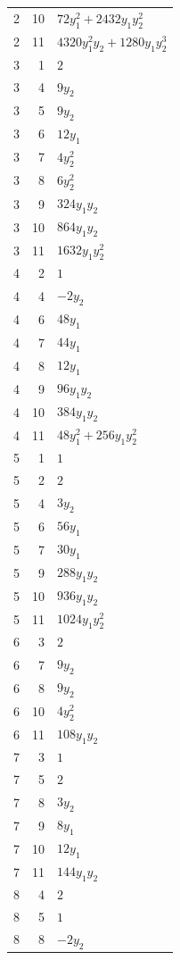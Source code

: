 \documentclass[10pt,a4paper]{article}
\begin{document}
{\begin{longtable}{rrp{125mm}}
2 & 10 & $72 y_{1}^{2} + 2432 y_{1} y_{2}^{2}$\\
2 & 11 & $4320 y_{1}^{2} y_{2} + 1280 y_{1} y_{2}^{3}$\\
3 & 1 & $2$\\
3 & 4 & $9 y_{2}$\\
3 & 5 & $9 y_{2}$\\
3 & 6 & $12 y_{1}$\\
3 & 7 & $4 y_{2}^{2}$\\
3 & 8 & $6 y_{2}^{2}$\\
3 & 9 & $324 y_{1} y_{2}$\\
3 & 10 & $864 y_{1} y_{2}$\\
3 & 11 & $1632 y_{1} y_{2}^{2}$\\
4 & 2 & $1$\\
4 & 4 & $- 2 y_{2}$\\
4 & 6 & $48 y_{1}$\\
4 & 7 & $44 y_{1}$\\
4 & 8 & $12 y_{1}$\\
4 & 9 & $96 y_{1} y_{2}$\\
4 & 10 & $384 y_{1} y_{2}$\\
4 & 11 & $48 y_{1}^{2} + 256 y_{1} y_{2}^{2}$\\
5 & 1 & $1$\\
5 & 2 & $2$\\
5 & 4 & $3 y_{2}$\\
5 & 6 & $56 y_{1}$\\
5 & 7 & $30 y_{1}$\\
5 & 9 & $288 y_{1} y_{2}$\\
5 & 10 & $936 y_{1} y_{2}$\\
5 & 11 & $1024 y_{1} y_{2}^{2}$\\
6 & 3 & $2$\\
6 & 7 & $9 y_{2}$\\
6 & 8 & $9 y_{2}$\\
6 & 10 & $4 y_{2}^{2}$\\
6 & 11 & $108 y_{1} y_{2}$\\
7 & 3 & $1$\\
7 & 5 & $2$\\
7 & 8 & $3 y_{2}$\\
7 & 9 & $8 y_{1}$\\
7 & 10 & $12 y_{1}$\\
7 & 11 & $144 y_{1} y_{2}$\\
8 & 4 & $2$\\
8 & 5 & $1$\\
8 & 8 & $- 2 y_{2}$\\

\end{longtable}}
\end{document}
